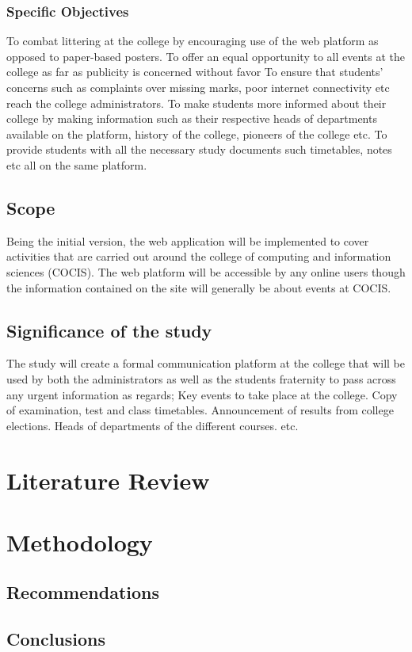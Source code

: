 \documentclass{article}
\begin{document}
\subsubsection{Specific Objectives}
To combat littering at the college by encouraging use of the web platform as opposed to paper-based posters.
To offer an equal opportunity to all events at the college as far as publicity is concerned without favor
To ensure that students’ concerns such as complaints over missing marks, poor internet connectivity etc reach the college administrators.
To make students more informed about their college by making information such as their respective heads of departments available on the platform, history of the college, pioneers of the college etc.
To provide students with all the necessary study documents such timetables, notes etc all on the same platform.

\subsection{Scope}
Being the initial version, the web application will be implemented to cover activities that are carried out around the college of computing and information sciences (COCIS). The web platform will be accessible by any online users though the information contained on the site will generally be about events at COCIS.

\subsection{Significance of the study}
The study will create a formal communication platform at the college that will be used by both the administrators as well as the students fraternity to pass across any urgent information as regards;
Key events to take place at the college.
Copy of examination, test and class timetables.
Announcement of results from college elections.
Heads of departments of the different courses. etc.  
\section{Literature Review}


\section{Methodology}

\subsection{Recommendations}

\subsection{Conclusions}
\end{document}
